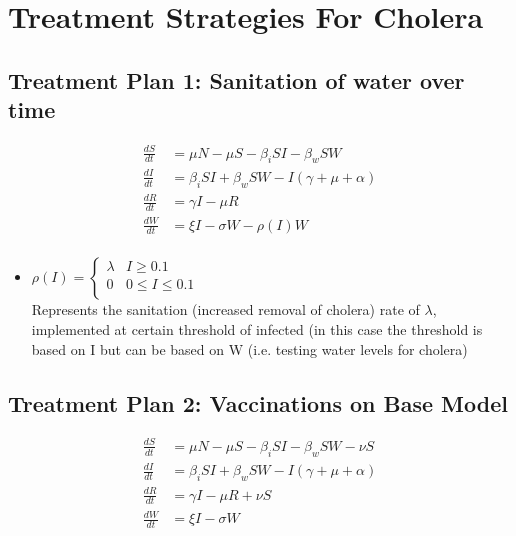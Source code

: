 \documentclass[12pt]{article}\usepackage[]{graphicx}\usepackage[]{color}
\begin{document}
\section{Treatment Strategies For Cholera}

\subsection{Treatment Plan 1: Sanitation of water over time}

\begin{linenomath}
\begin{align*}
	\frac{dS}{dt}&= \mu N - \mu S - \beta_i SI - \beta_w S W  \\
	\frac{dI}{dt}&= \beta_i S I + \beta_w S W - I (\gamma + \mu + \alpha) \\
	\frac{dR}{dt}&= \gamma I - \mu R \\
	\frac{dW}{dt}&= \xi I  - \sigma W - \rho (I) W\\
\end{align*}
\end{linenomath}

\begin{itemize}
	\item $\rho (I)= \begin{cases}
			 			\lambda & I \geq 0.1 \\
			 			0 & 0 \leq I \leq 0.1 \\
			 			\end{cases}$\\
	Represents the sanitation (increased removal of cholera) rate of $\lambda$, implemented at certain threshold of infected (in this case the threshold is based on I but can be based on W (i.e. testing water levels for cholera) %
\end{itemize}


\subsection{Treatment Plan 2: Vaccinations on Base Model}

\begin{linenomath}
\begin{align*}
	\frac{dS}{dt}&= \mu N - \mu S - \beta_i SI - \beta_w S W - \nu S \\
	\frac{dI}{dt}&= \beta_i S I + \beta_w S W - I (\gamma + \mu + \alpha) \\
	\frac{dR}{dt}&= \gamma I - \mu R + \nu S\\
	\frac{dW}{dt}&= \xi I  - \sigma W\\
\end{align*}
\end{linenomath}
\end{document}
